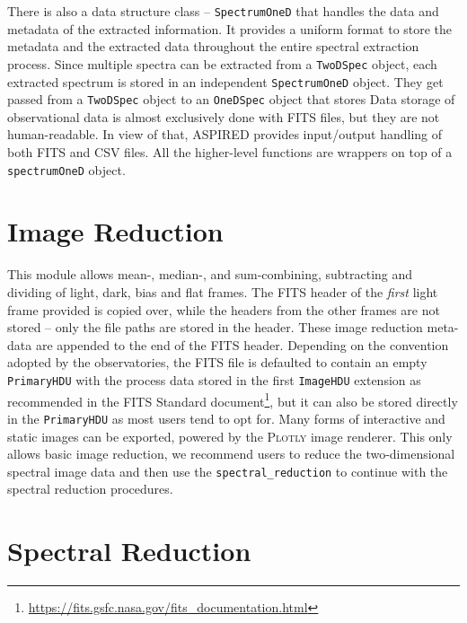 \documentclass[linenumbers, twocolumn]{aastex631}
\begin{document}
There is also a data structure class -- \texttt{SpectrumOneD} that handles the
data and metadata of the extracted information. It provides a uniform format
to store the metadata and the extracted data throughout the entire spectral
extraction process. Since multiple spectra can be extracted from a
\texttt{TwoDSpec} object, each extracted spectrum is stored in an independent
\texttt{SpectrumOneD} object. They get passed from a \texttt{TwoDSpec} object
to an \texttt{OneDSpec} object that stores Data storage of observational data is
almost exclusively done with FITS files, but they are not human-readable. In
view of that, \textsc{ASPIRED} provides input/output handling of both FITS and
CSV files. All the higher-level functions are wrappers on top of a
\texttt{spectrumOneD} object.

\section{Image Reduction}
\label{sec:image_reduction}
This module allows mean-, median-, and sum-combining, subtracting and dividing
of light, dark, bias and flat frames. The FITS header of the \textit{first}
light frame provided is copied over, while the headers from the other frames
are not stored -- only the file paths are stored in the header. These image
reduction meta-data are appended to the end of the FITS header. Depending on
the convention adopted by the observatories, the FITS file is defaulted to
contain an empty \texttt{PrimaryHDU} with the process data stored in the
first \texttt{ImageHDU} extension as recommended in the FITS Standard 
document\footnote{\url{https://fits.gsfc.nasa.gov/fits_documentation.html}},
but it can also be stored directly in the \texttt{PrimaryHDU} as most users tend
to opt for. Many forms of interactive and static images can be exported,
powered by the \textsc{Plotly} image renderer. This only allows basic image
reduction, we recommend users to reduce the two-dimensional spectral image
data and then use the \texttt{spectral\_reduction} to continue with the
spectral reduction procedures.

\section{Spectral Reduction}
\label{sec:spectral_reduction}
\end{document}
